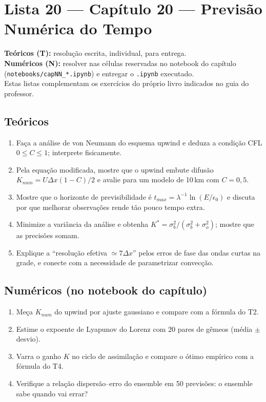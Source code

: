 \documentclass[11pt]{article}
\newcommand{\instrucoes}{%
\begin{caixalista}
\textbf{Teóricos (T):} resolução escrita, individual, para entrega.\\
\textbf{Numéricos (N):} resolver nas células reservadas no notebook do
capítulo (\texttt{notebooks/capNN\_*.ipynb}) e entregar o
\texttt{.ipynb} executado.\\
Estas listas complementam os exercícios do próprio livro indicados no
guia do professor.
\end{caixalista}}
\begin{document}
\clearpage
\section*{Lista 20 --- Capítulo 20 --- Previsão Numérica do Tempo}
\instrucoes

\subsection*{Teóricos}

\begin{enumerate}[label=\textbf{T\arabic*.},itemsep=4pt]
  \item Faça a análise de von Neumann do esquema upwind e deduza a
        condição CFL $0 \le C \le 1$; interprete fisicamente.
  \item Pela equação modificada, mostre que o upwind embute difusão
        $K_{num} = U\Delta x(1-C)/2$ e avalie para um modelo de
        10\,km com $C = 0{,}5$.
  \item Mostre que o horizonte de previsibilidade é
        $t_{max} = \lambda^{-1}\ln(E/\epsilon_0)$ e discuta por que
        melhorar observações rende tão pouco tempo extra.
  \item Minimize a variância da análise e obtenha
        $K^* = \sigma_b^2/(\sigma_b^2+\sigma_o^2)$; mostre que as
        precisões somam.
  \item Explique a ``resolução efetiva $\simeq 7\Delta x$'' pelos
        erros de fase das ondas curtas na grade, e conecte com a
        necessidade de parametrizar convecção.
\end{enumerate}

\subsection*{Numéricos (no notebook do capítulo)}

\begin{enumerate}[label=\textbf{N\arabic*.},itemsep=4pt]
  \item Meça $K_{num}$ do upwind por ajuste gaussiano e compare com a
        fórmula do T2.
  \item Estime o expoente de Lyapunov do Lorenz com 20 pares de
        gêmeos (média $\pm$ desvio).
  \item Varra o ganho $K$ no ciclo de assimilação e compare o ótimo
        empírico com a fórmula do T4.
  \item Verifique a relação dispersão--erro do ensemble em 50
        previsões: o ensemble sabe quando vai errar?
\end{enumerate}
\end{document}
